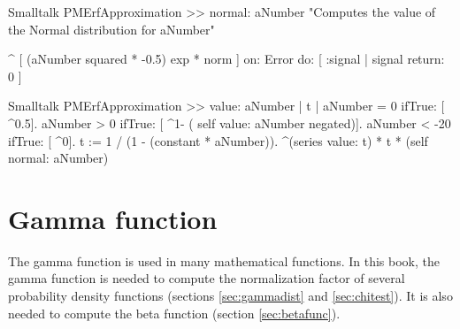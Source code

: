 \begin{displaycode}{Smalltalk}
PMErfApproximation >> normal: aNumber
   "Computes the value of the Normal distribution for aNumber"

   ^ [ (aNumber squared * -0.5) exp * norm ]
     on: Error
     do: [ :signal | signal return: 0 ]
\end{displaycode}

\begin{displaycode}{Smalltalk}
PMErfApproximation >> value: aNumber
    | t |
    aNumber = 0
        ifTrue: [ ^0.5].
    aNumber > 0
        ifTrue: [ ^1- ( self value: aNumber negated)].
    aNumber < -20
        ifTrue: [ ^0].
    t := 1 / (1 - (constant * aNumber)).
    ^(series value: t) * t * (self normal: aNumber)
\end{displaycode}

\section{Gamma function}
The gamma function is used in many mathematical functions. In this
book, the gamma function is needed to compute the normalization
factor of several probability density functions (\cf sections
\ref{sec:gammadist} and \ref{sec:chitest}). It is also needed to
compute the beta function (\cf section \ref{sec:betafunc}).

